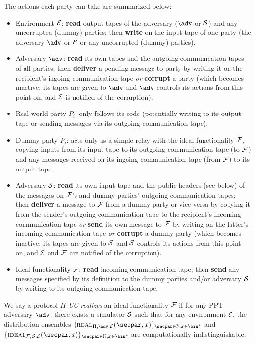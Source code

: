 The actions each party can take are summarized below:
\begin{itemize}
   \item Environment $\mathcal{E}$: \textbf{read} output tapes of the adversary ($\adv$ or $\mathcal{S}$) and any uncorrupted (dummy) parties; then \textbf{write} on the input tape of one party (the adversary $\adv$ or $\mathcal{S}$ or any uncorrupted (dummy) parties).
   \item Adversary $\adv$: \textbf{read} its own tapes and the outgoing communication tapes of all parties; then \textbf{deliver} a pending message to party by writing it on the recipient's ingoing communication tape \emph{or} \textbf{corrupt} a party (which becomes inactive: its tapes are given to $\adv$ and $\adv$ controls its actions from this point on, and $\mathcal{E}$ is notified of the corruption).
   \item Real-world party $P_i$: only follows its code (potentially writing to its output tape or sending messages via its outgoing communication tape).
   \item Dummy party $\tilde{P}_i$: acts only as a simple relay with the ideal functionality $\mathcal{F}$, copying inputs from its input tape to its outgoing communication tape (to $\mathcal{F}$) and any messages received on its ingoing communication tape (from $\mathcal{F}$) to its output tape.
   \item Adversary $\mathcal{S}$: \textbf{read} its own input tape and the public headers (see below) of the messages on $\mathcal{F}$'s and dummy parties' outgoing communication tapes; then \textbf{deliver} a message to $\mathcal{F}$ from a dummy party or vice versa by copying it from the sender's outgoing communication tape to the recipient's incoming communication tape \emph{or} \textbf{send} its own message to $\mathcal{F}$ by writing on the latter's incoming communication tape \emph{or} \textbf{corrupt} a dummy party (which becomes inactive: its tapes are given to $\mathcal{S}$ and $\mathcal{S}$ controls its actions from this point on, and $\mathcal{E}$ and $\mathcal{F}$ are notified of the corruption).
   \item Ideal functionality $\mathcal{F}$: \textbf{read} incoming communication tape; then \textbf{send} any messages specified by its definition to the dummy parties and/or adversary $\mathcal{S}$ by writing to its outgoing communication tape.
\end{itemize}

\begin{definition}
    We say a protocol $\Pi$ \emph{UC-realizes} an ideal functionality $\mathcal{F}$ if for any PPT adversary $\adv$, there exists a simulator $\mathcal{S}$ such that for any environment $\mathcal{E}$, the distribution ensembles $\{ \real_{\Pi,\adv,\env}(\secpar, x) \}_{\secpar \in \mathbb{N}, x \in \bin^*}$ and $\{ \ideal_{\F,\Sim,\env}(\secpar,\allowbreak x) \}_{\secpar \in \mathbb{N},x \in \bin^*}$ are computationally indistinguishable.
\end{definition}